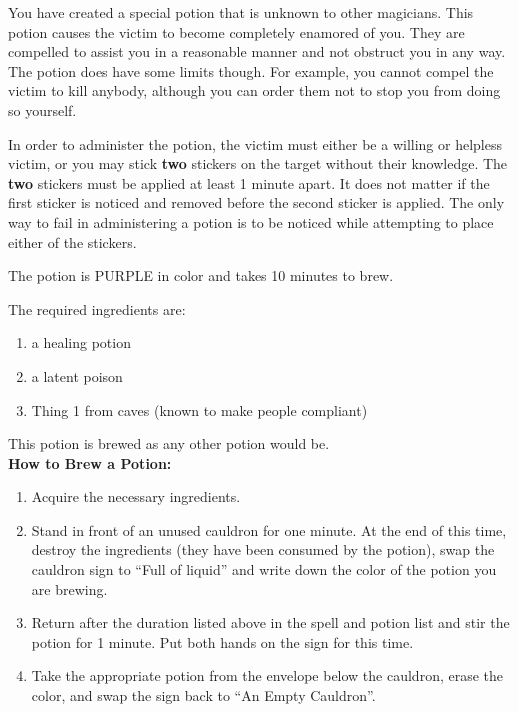 \documentclass[green]{NeptuneBall}
\begin{document}
\name{\gLove{}}

You have created a special potion that is unknown to other magicians. This potion causes the victim to become completely enamored of you. They are compelled to assist you in a reasonable manner and not obstruct you in any way. The potion does have some limits though. For example, you cannot compel the victim to kill anybody, although you can order them not to stop you from doing so yourself.

In order to administer the potion, the victim must either be a willing or helpless victim, or you may stick {\bf two} stickers on the target without their knowledge. The {\bf two} stickers must be applied at least 1 minute apart. It does not matter if the first sticker is noticed and removed before the second sticker is applied. The only way to fail in administering a potion is to be noticed while attempting to place either of the stickers.

The potion is PURPLE in color and takes 10 minutes to brew.

The required ingredients are:
\begin{enumerate}
\item a healing potion 
\item a latent poison
\item Thing 1 from caves (known to make people compliant) %
\end{enumerate}

This potion is brewed as any other potion would be.\\

{\bf How to Brew a Potion:}\\ %
\begin{enumerate}
  \item Acquire the necessary ingredients.
  \item Stand in front of an unused cauldron for one minute. At the end of this time, destroy the ingredients (they have been consumed by the potion), swap the cauldron sign to ``Full of liquid'' and write down the color of the potion you are brewing.
  \item Return after the duration listed above in the spell and potion list and stir the potion for 1 minute. Put both hands on the sign for this time.
  \item Take the appropriate potion from the envelope below the cauldron, erase the color, and swap the sign back to ``An Empty Cauldron''.
\end{enumerate}
\end{document}

